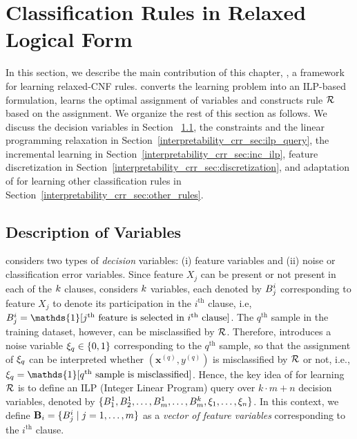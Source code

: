 \section{Classification Rules in Relaxed Logical Form}
\label{interpretability_crr_sec:ilp}
In this section, we describe the main contribution of this chapter, {\crr}, a  framework for learning   relaxed-CNF rules.  {\crr}  converts the learning problem into  an ILP-based formulation,  learns the optimal assignment of variables and constructs rule $ {\mathcal{R}} $ based on the assignment. We organize the rest of this section as follows.
We  discuss the decision variables in Section ~\ref{interpretability_crr_sec:variables},  the constraints and the linear programming relaxation in Section~\ref{interpretability_crr_sec:ilp_query}, the incremental learning in Section~\ref{interpretability_crr_sec:inc_ilp}, feature discretization in Section~\ref{interpretability_crr_sec:discretization}, and adaptation of {\crr} for learning other classification rules in Section~\ref{interpretability_crr_sec:other_rules}.




\subsection{Description of Variables}
\label{interpretability_crr_sec:variables}
{\crr} considers two types of  \emph{decision} variables: (i) feature variables and (ii) noise or classification error variables.
Since  feature $ X_j $ can be present or not present  in each of  the  $ k $ clauses, {\crr} considers $ k $   variables, each denoted by $ B^i_j  $  corresponding to   feature $ X_j $  to denote its participation  in the $ i^\text{th} $ clause, i.e, $ \bool^i_j=\mathds{1}[j^\text{th}\text{ feature is selected in }i^\text{th}\text{ clause}]  $.  The $ q^\text{th} $ sample in the training dataset, however, can be misclassified by $ {\mathcal{R}} $.  Therefore, {\crr}  introduces  a noise variable $ \xi_q \in \{0,1\}  $  corresponding to the $ q^\text{th} $ sample, so that the assignment of $ \xi_q  $ can be interpreted whether $ (\mathbf{x}^{(q)}, y^{(q)}) $ is misclassified by $ {\mathcal{R}} $ or not, i.e., $ \noise_q=\mathds{1}[q^\text{th}\text{ sample is misclassified}] $.  Hence, the key idea of {{\crr}} for learning $ {\mathcal{R}} $ is to define an ILP (Integer Linear Program) query over $k \cdot m + n$  decision variables, denoted by $\{ B_{1}^{1}, B_{2}^{1}, \dots ,B_{m}^{1}, \dots ,B_{m}^{k}, \xi_1, \dots ,\xi_n\}$.   In this context, we define $\mathbf{B}_i = \{B^i_{j} \mid j= 1,\dots,m\}$ as a \emph{vector of   feature variables} corresponding to the $ i^\text{th} $ clause.


